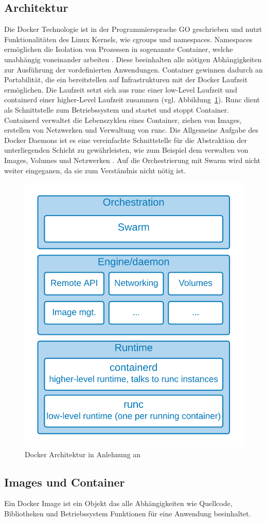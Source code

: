 \subsection{Architektur}
Die Docker Technologie ist in der Programmiersprache \glqq GO\grqq{} geschrieben und nutzt Funktionalitäten des
Linux Kernels, wie cgroups und namespaces.
Namespaces ermöglichen die Isolation von Prozessen in sogenannte Container, welche unabhängig voneinander arbeiten \cite{dockergetstarted}.
Diese beeinhalten alle nötigen Abhängigkeiten zur Ausführung der vordefinierten Anwendungen.
Container gewinnen dadurch an Portabilität, die ein bereitstellen auf Infrastrukturen mit der Docker
Laufzeit ermöglichen.
Die Laufzeit setzt sich aus \glqq runc\grqq{} einer low-Level Laufzeit und \glqq containerd\grqq{} einer higher-Level
Laufzeit zusammen (vgl. Abbildung~\ref{fig:dockerarch}).
Runc dient als Schnittstelle zum Betriebssystem und startet und stoppt Container.
Containerd verwaltet die Lebenszyklen eines Container, ziehen von Images, erstellen von Netzwerken und
Verwaltung von runc.
Die Allgemeine Aufgabe des Docker Daemons ist es eine vereinfachte Schnittstelle für die Abstraktion
der unterliegenden Schicht zu gewährleisten, wie zum Beispiel dem verwalten von Images, Volumes und Netzwerken \cite{dockerdeep}.
Auf die Orchestrierung mit Swarm wird nicht weiter eingeganen, da sie zum Verständnis nicht nötig ist.

\begin{figure}
    \centering
    \includegraphics[width=0.5\columnwidth]{images/DockerArch.png}
    \caption{Docker Architektur in Anlehnung an \protect\cite{dockerdeep}}
    \label{fig:dockerarch}
\end{figure}

\subsection{Images und Container}
Ein Docker Image ist ein Objekt das alle Abhängigkeiten wie Quellcode, Bibliotheken und Betriebssystem
Funktionen für eine Anwendung beeinhaltet. 

